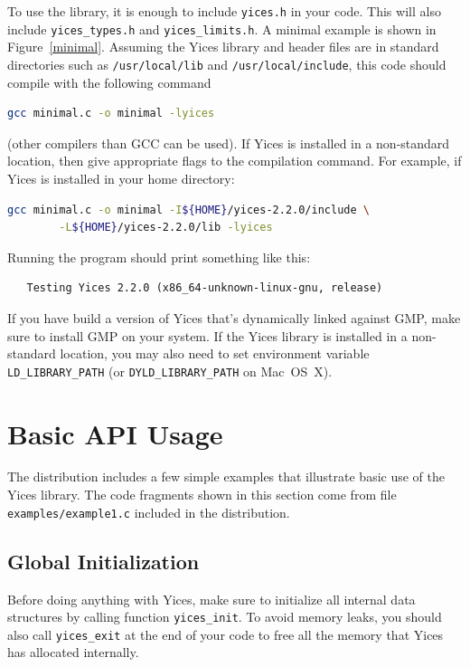 \documentclass[11pt,twoside,fleqn,openright,titlepage]{cslreport}
\begin{document}
To use the library, it is enough to include \texttt{yices.h} in your
code. This will also include \texttt{yices\_types.h} and
\texttt{yices\_limits.h}. A minimal example is shown in
Figure~\ref{minimal}. Assuming the Yices library and header files are
in standard directories such as \texttt{/usr/local/lib} and
\texttt{/usr/local/include}, this code should compile with the
following command
\begin{small}
\begin{lstlisting}[language=sh]
   gcc minimal.c -o minimal -lyices
\end{lstlisting}
\end{small}
(other compilers than GCC can be used). If Yices is installed in a
non-standard location, then give appropriate flags to the compilation
command. For example, if Yices is installed in your home directory:
\begin{small}
\begin{lstlisting}[language=sh]
   gcc minimal.c -o minimal -I${HOME}/yices-2.2.0/include \
        -L${HOME}/yices-2.2.0/lib -lyices
\end{lstlisting}
\end{small}
Running the program should print something like this:
\begin{small}
\begin{verbatim}
   Testing Yices 2.2.0 (x86_64-unknown-linux-gnu, release)
\end{verbatim}
\end{small}
If you have build a version of Yices that's dynamically linked against
GMP, make sure to install GMP on your system.  If the Yices library is
installed in a non-standard location, you may also need to set
environment variable \texttt{LD\_LIBRARY\_PATH} (or
\texttt{DYLD\_LIBRARY\_PATH} on Mac~OS~X).


\section{Basic API Usage}

The distribution includes a few simple examples that illustrate basic
use of the Yices library. The code fragments shown in this section
come from file \texttt{examples/example1.c} included in the
distribution.

\subsection*{Global Initialization}

Before doing anything with Yices, make sure to initialize all internal
data structures by calling function \texttt{yices\_init}.  To avoid
memory leaks, you should also call \texttt{yices\_exit} at the end of
your code to free all the memory that Yices has allocated internally.
\end{document}
